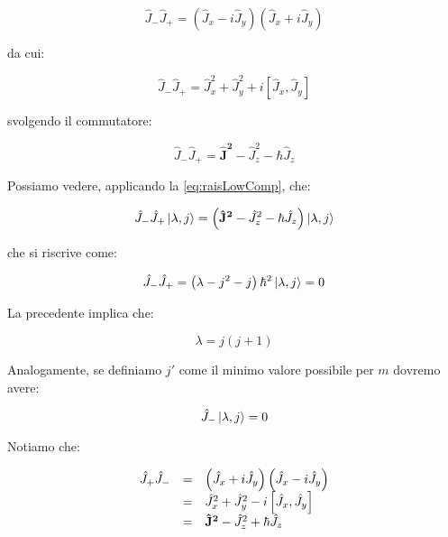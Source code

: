	\begin{equation}
		\hat{J}_- \hat{J}_+ = \left ( \hat{J}_x - i \hat{J}_y \right ) \left ( \hat{J}_x + i \hat{J}_y \right )
	\end{equation}

da cui:

	\begin{equation}
		\hat{J}_- \hat{J}_+ = \hat{J}^2_x + \hat{J}^2_y + i \left [ \hat{J}_x, \hat{J}_y \right ]
	\end{equation}

svolgendo il commutatore:

	\begin{equation} \label{eq:raisLowComp}
		\hat{J}_- \hat{J}_+	= \mathbf{\hat{J}^2} - \hat{J}_z^2 - \hbar \hat{J}_z
	\end{equation}

Possiamo vedere, applicando la \eqref{eq:raisLowComp}, che:

	\begin{equation}
		\hat{J}_- \hat{J}_+ \ket{\lambda, j} = \left ( \mathbf{\hat{J}^2} - \hat{J}_z^2 - \hbar \hat{J}_z \right ) \ket{\lambda, j}
	\end{equation}

che si riscrive come:

	\begin{equation}
		\hat{J}_- \hat{J}_+ = \left( \lambda - j^2 - j \right ) \hbar^2 \ket{\lambda, j} = 0
	\end{equation}

La precedente implica che:

	\begin{equation} \label{eq:lambdaVinc1}
		\lambda = j ( j + 1 )
	\end{equation}

Analogamente, se definiamo $j'$ come il minimo valore possibile per $m$ dovremo avere:

	\begin{equation}
		\hat{J}_- \ket{\lambda, j} = 0
	\end{equation}

Notiamo che:

	\begin{equation}
		\begin{array}{c c l}
			\hat{J}_+ \hat{J}_- & = & \left ( \hat{J}_x + i \hat{J}_y \right ) \left ( \hat{J}_x - i \hat{J}_y \right ) \\
			& = & \hat{J}^2_x + \hat{J}^2_y - i \left [ \hat{J}_x, \hat{J}_y \right ] \\
			& = & \mathbf{\hat{J}^2} - \hat{J}^2_z + \hbar \hat{J}_z
		\end{array}
	\end{equation}

